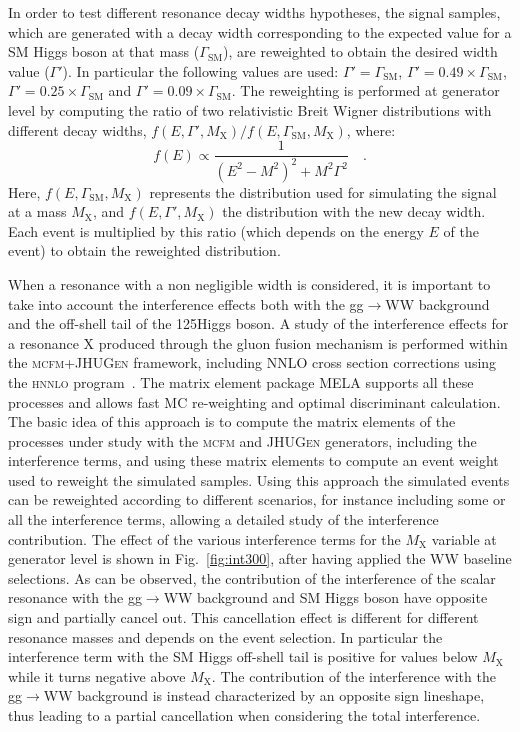 In order to test different resonance decay widths hypotheses, the signal samples, which are generated with a decay width corresponding to the expected value for a SM Higgs boson at that mass ($\Gamma_\mathrm{SM}$), are reweighted to obtain the desired width value ($\Gamma'$). In particular the following values are used: $\Gamma' = \Gamma_\mathrm{SM}$, $\Gamma' = 0.49 \times \Gamma_\mathrm{SM}$, $\Gamma' = 0.25 \times \Gamma_\mathrm{SM}$ and $\Gamma' = 0.09 \times \Gamma_\mathrm{SM}$.
The reweighting is performed at generator level by computing the ratio of two relativistic Breit Wigner distributions with different decay widths, $f(E,\Gamma',M_\mathrm{X})/f(E,\Gamma_\mathrm{SM},M_\mathrm{X})$, where:
\begin{equation}
f(E) \propto \frac{1}{(E^2 - M^2)^2 + M^2\Gamma^2} \quad .
\end{equation}
Here, $f(E,\Gamma_\mathrm{SM},M_\mathrm{X})$ represents the distribution used for simulating the signal at a mass $M_\mathrm{X}$, and $f(E,\Gamma',M_\mathrm{X})$ the distribution with the new decay width. Each event is multiplied by this ratio (which depends on the energy $E$ of the event) to obtain the reweighted distribution.

When a resonance with a non negligible width is considered, it is important to take into account the interference effects both with the gg$\to$WW background and the off-shell tail of the 125\GeV Higgs boson.
A study of the interference effects for a resonance X produced through the gluon fusion mechanism is performed within the \textsc{mcfm}+\textsc{JHUGen} framework, including NNLO cross section corrections using the \textsc{hnnlo} program~\cite{Grazzini:2008tf}. The matrix element package MELA supports all these processes and allows fast MC re-weighting and optimal discriminant calculation. The basic idea of this approach is to compute the matrix elements of the processes under study with the \textsc{mcfm} and \textsc{JHUGen} generators, including the interference terms, and using these matrix elements to compute an event weight used to reweight the simulated samples. Using this approach the simulated events can be reweighted according to different scenarios, for instance including some or all the interference terms, allowing a detailed study of the interference contribution. The effect of the various interference terms for the $M_\mathrm{X}$ variable at generator level is shown in Fig.~\ref{fig:int300}, after having applied the WW baseline selections. As can be observed, the contribution of the interference of the scalar resonance with the gg$\to$WW background and SM Higgs boson have opposite sign and partially cancel out. This cancellation effect is different for different resonance masses and depends on the event selection.
In particular the interference term with the SM Higgs off-shell tail is positive for values below $M_\mathrm{X}$ while it turns negative above $M_\mathrm{X}$. The contribution of the interference with the gg$\to$WW background is instead characterized by an opposite sign lineshape, thus leading to a partial cancellation when considering the total interference.

